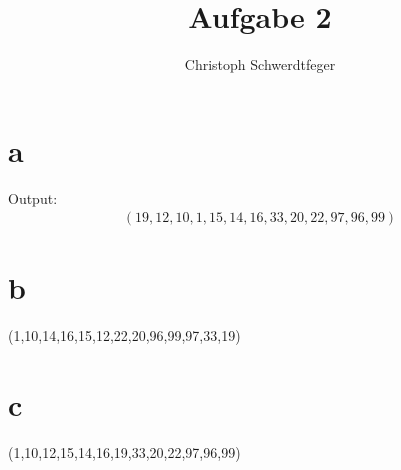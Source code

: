 \documentclass[10pt]{article} %
\title{ Aufgabe 2}
\author{Christoph Schwerdtfeger}
\numberwithin{equation}{section}
\begin{document}
\maketitle
\section{a}
Output: \begin{align}
(19,12,10,1,15,14,16,33,20,22,97,96,99)
\end{align}
\section[]{b}
(1,10,14,16,15,12,22,20,96,99,97,33,19)
\section[]{c}
(1,10,12,15,14,16,19,33,20,22,97,96,99)
\end{document}
